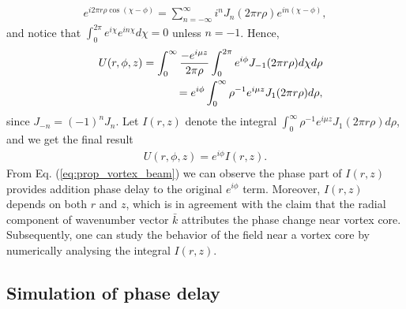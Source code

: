 {\begin{eqnarray}
	e^{i 2 \pi r \rho \cos(\chi - \phi)} = 
		\sum_{n = -\infty}^{\infty} i^{n} J_n(2 \pi r \rho) e^{i n (\chi - \phi)},
	\nonumber
\end{eqnarray}
and notice that $ \int_{0}^{2\pi} e^{i \chi} e^{i n \chi} d\chi = 0$ unless $n = -1$. Hence,
\begin{eqnarray}
	&&U(r, \phi, z) = \int_{0}^{\infty} \frac{- e^{i \mu z}}{2 \pi \rho} \int_{0}^{2\pi} e^{i\phi} J_{-1}(2 \pi r \rho) d\chi d\rho
	\nonumber\\
	&& \hspace{0.5in} = e^{i \phi} \int_{0}^{\infty} \rho^{-1} e^{i \mu z} J_1(2 \pi r \rho) d\rho,
\end{eqnarray}
since $J_{-n} = (-1)^n J_{n}$. Let $I(r, z)$ denote the integral $\int_{0}^{\infty} \rho^{-1} e^{i \mu z} J_1 (2 \pi r \rho) d\rho$, and we get the final result
\begin{eqnarray}
	U(r, \phi, z) = e^{i\phi} I(r, z).
	\label{eq:prop_vortex_beam}
\end{eqnarray}
From Eq. (\ref{eq:prop_vortex_beam}) we can observe the phase part of $I(r, z)$ provides addition phase delay to the original $e^{i \phi}$ term. Moreover, $I(r, z)$ depends on both $r$ and $z$, which is in agreement with the claim that the radial component of wavenumber vector $\bar{k}$ attributes the phase change near vortex core. Subsequently, one can study the behavior of the field near a vortex core by numerically analysing the integral $I(r, z)$.
\subsection{Simulation of phase delay}
}